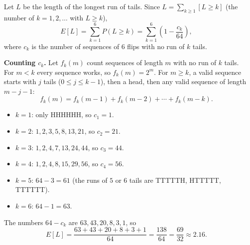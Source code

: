 Let $L$ be the length of the longest run of tails. Since $L=\sum_{k\ge1}[L\ge k]$ (the number of $k=1,2,\dots$ with $L\ge k$),
\[E[L]=\sum_{k=1}^{6}P(L\ge k)=\sum_{k=1}^{6}\left(1-\dfrac{c_k}{64}\right),\]
where $c_k$ is the number of sequences of $6$ flips with no run of $k$ tails.

\textbf{Counting $c_k$.} Let $f_k(m)$ count sequences of length $m$ with no run of $k$ tails. For $m<k$ every sequence works, so $f_k(m)=2^m$. For $m\ge k$, a valid sequence starts with $j$ tails ($0\le j\le k-1$), then a head, then any valid sequence of length $m-j-1$:
\[f_k(m)=f_k(m-1)+f_k(m-2)+\cdots+f_k(m-k).\]
\begin{itemize}
\item $k=1$: only HHHHHH, so $c_1=1$.
\item $k=2$: $1,2,3,5,8,13,21$, so $c_2=21$.
\item $k=3$: $1,2,4,7,13,24,44$, so $c_3=44$.
\item $k=4$: $1,2,4,8,15,29,56$, so $c_4=56$.
\item $k=5$: $64-3=61$ (the runs of $5$ or $6$ tails are TTTTTH, HTTTTT, TTTTTT).
\item $k=6$: $64-1=63$.
\end{itemize}
The numbers $64-c_k$ are $63,43,20,8,3,1$, so
\[E[L]=\dfrac{63+43+20+8+3+1}{64}=\dfrac{138}{64}=\boxed{\dfrac{69}{32}}\approx2.16.\]
